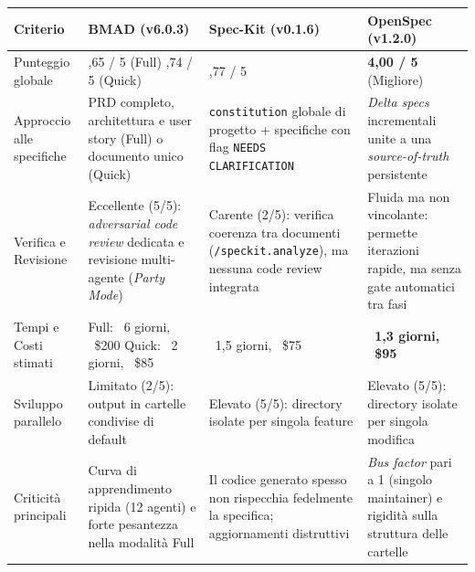 \documentclass[a4paper, 11pt]{article}
\begin{document}
\vspace{0.25cm}
\noindent
{\small
\renewcommand{\arraystretch}{1.2}
\begin{tabularx}{\textwidth}{|l|>{\raggedright\arraybackslash}X|>{\raggedright\arraybackslash}X|>{\raggedright\arraybackslash}X|}
    \hline
    \textbf{Criterio} & \textbf{BMAD (v6.0.3)} & \textbf{Spec-Kit (v0.1.6)} & \textbf{OpenSpec (v1.2.0)} \\ \hline
    Punteggio globale & 3,65 / 5 (Full) \newline 3,74 / 5 (Quick) & 2,77 / 5 & \textbf{4,00 / 5} (Migliore) \\ \hline
    Approccio alle specifiche & PRD completo, architettura e user story (Full) o documento unico (Quick) & \texttt{constitution} globale di progetto + specifiche con flag \texttt{NEEDS CLARIFICATION} & \textit{Delta specs} incrementali unite a una \textit{source-of-truth} persistente \\ \hline
    Verifica e Revisione & Eccellente (5/5): \textit{adversarial code review} dedicata e revisione multi-agente (\textit{Party Mode}) & Carente (2/5): verifica coerenza tra documenti (\texttt{/speckit.analyze}), ma nessuna code review integrata & Fluida ma non vincolante: permette iterazioni rapide, ma senza gate automatici tra fasi \\ \hline
    Tempi e Costi stimati & Full: ~6 giorni, ~\$200 \newline Quick: ~2 giorni, ~\$85 & ~1,5 giorni, ~\$75 & \textbf{~1,3 giorni, ~\$95} \\ \hline
    Sviluppo parallelo & Limitato (2/5): output in cartelle condivise di default & Elevato (5/5): directory isolate per singola feature & Elevato (5/5): directory isolate per singola modifica \\ \hline
    Criticità principali & Curva di apprendimento ripida (12 agenti) e forte pesantezza nella modalità Full & Il codice generato spesso non rispecchia fedelmente la specifica; aggiornamenti distruttivi & \textit{Bus factor} pari a 1 (singolo maintainer) e rigidità sulla struttura delle cartelle \\ \hline
\end{tabularx}
}
\vspace{0.25cm}
\end{document}
